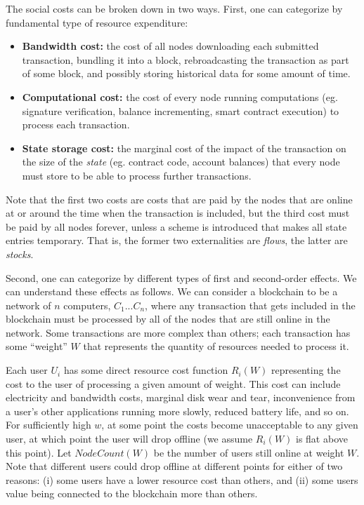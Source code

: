 \documentclass[12pt, final]{article}
\begin{document}
The social costs can be broken down in two ways. First, one can categorize by fundamental type of resource expenditure:

\begin{itemize}
\item[] \textbf{Bandwidth cost:} the cost of all nodes downloading each submitted transaction, bundling it into a block, rebroadcasting the transaction as part of some block, and possibly storing historical data for some amount of time.

\item[] \textbf{Computational cost:} the cost of every node running computations (eg. signature verification, balance incrementing, smart contract execution) to process each transaction.

\item[] \textbf{State storage cost:} the marginal cost of the impact of the transaction on the size of the \emph{state} (eg. contract code, account balances) that every node must store to be able to process further transactions.
\end{itemize}

Note that the first two costs are costs that are paid by the nodes that are online at or around the time when the transaction is included, but the third cost must be paid by all nodes forever, unless a scheme is introduced that makes all state entries temporary. That is, the former two externalities are \emph{flows}, the latter are \emph{stocks}.

Second, one can categorize by different types of first and second-order effects. We can understand these effects as follows. We can consider a blockchain to be a network of $n$ computers, $C_1 ... C_n$, where any transaction that gets included in the blockchain must be processed by all of the nodes that are still online in the network. Some transactions are more complex than others; each transaction has some ``weight'' $W$ that represents the quantity of resources needed to process it.

Each user $U_i$ has some direct resource cost function $R_i(W)$ representing the cost to the user of processing a given amount of weight. This cost can include electricity and bandwidth costs, marginal disk wear and tear, inconvenience from a user's other applications running more slowly, reduced battery life, and so on. For sufficiently high $w$, at some point the costs become unacceptable to any given user, at which point the user will drop offline (we assume $R_i(W)$ is flat above this point). Let $NodeCount(W)$ be the number of users still online at weight $W$. Note that different users could drop offline at different points for either of two reasons: (i) some users have a lower resource cost than others, and (ii) some users value being connected to the blockchain more than others.
\end{document}
